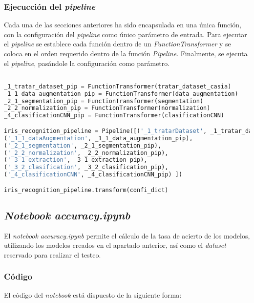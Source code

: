 {\subsubsection{Ejecucción del \textit{pipeline}}

Cada una de las secciones anteriores ha sido encapsulada en una única función, con la configuración del \textit{pipeline} como único parámetro de entrada.
Para ejecutar el \textit{pipeline} se establece cada función dentro de un \textit{FunctionTransformer} y se coloca en el orden requerido dentro de la función \textit{Pipeline}.
Finalmente, se ejecuta el \textit{pipeline}, pasándole la configuración como parámetro.


\begin{lstlisting}[language=Python] 

_1_tratar_dataset_pip = FunctionTransformer(tratar_dataset_casia)
_1_1_data_augmentation_pip = FunctionTransformer(data_augmentation)
_2_1_segmentation_pip = FunctionTransformer(segmentation)
_2_2_normalization_pip = FunctionTransformer(normalization)
_4_clasificationCNN_pip = FunctionTransformer(clasificationCNN)

iris_recognition_pipeline = Pipeline([('_1_tratarDataset', _1_tratar_dataset_pip), 
('_1_1_dataAugmentation', _1_1_data_augmentation_pip), 
('_2_1_segmentation', _2_1_segmentation_pip), 
('_2_2_normalization', _2_2_normalization_pip),
('_3_1_extraction', _3_1_extraction_pip),
('_3_2_clasification', _3_2_clasification_pip), 
('_4_clasificationCNN', _4_clasificationCNN_pip) ])

iris_recognition_pipeline.transform(confi_dict)

\end{lstlisting} 

\subsection{\textit{Notebook} \textit{accuracy.ipynb}} \label{anx:accuracy}

El \textit{notebook} \textit{accuracy.ipynb} permite el cálculo de la tasa de acierto de los modelos, utilizando los modelos creados en el apartado anterior,
así como el \textit{dataset} reservado para realizar el testeo.

\subsubsection{Código}

El código del \textit{notebook} está dispuesto de la siguiente forma:

}
